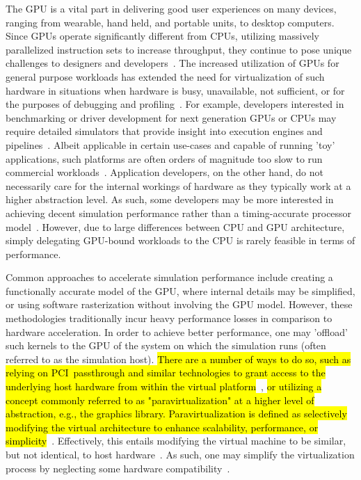 The GPU is a vital part in delivering good user experiences on many devices, ranging from wearable, hand held, and portable units, to desktop computers.
Since GPUs operate significantly different from CPUs, utilizing massively parallelized instruction sets to increase throughput, they continue to pose unique challenges to designers and developers~.
The increased utilization of GPUs for general purpose workloads has extended the need for virtualization of such hardware in situations when hardware is busy, unavailable, not sufficient, or for the purposes of debugging and profiling~.
For example, developers interested in benchmarking or driver development for next generation GPUs or CPUs may require detailed simulators that provide insight into execution engines and pipelines~.
Albeit applicable in certain use-cases and capable of running 'toy' applications, such platforms are often orders of magnitude too slow to run commercial workloads~.
Application developers, on the other hand, do not necessarily care for the internal workings of hardware as they typically work at a higher abstraction level.
As such, some developers may be more interested in achieving decent simulation performance rather than a timing-accurate processor model~.
However, due to large differences between CPU and GPU architecture, simply delegating GPU-bound workloads to the CPU is rarely feasible in terms of performance.

Common approaches to accelerate simulation performance include creating a functionally accurate model of the GPU, where internal details may be simplified, or using software rasterization without involving the GPU model.
However, these methodologies traditionally incur heavy performance losses in comparison to hardware acceleration.
In order to achieve better performance, one may 'offload' such kernels to the GPU of the system on which the simulation runs (often referred to as the simulation host).
\hl{There are a number of ways to do so, such as relying on PCI~passthrough and similar technologies to grant access to the underlying host hardware from within the virtual platform}~, \hl{or utilizing a concept commonly referred to as "paravirtualization" at a higher level of abstraction, e.g., the graphics library.
Paravirtualization is defined as selectively modifying the virtual architecture to enhance scalability, performance, or simplicity}~.
Effectively, this entails modifying the virtual machine to be similar, but not identical, to host hardware~.
As such, one may simplify the virtualization process by neglecting some hardware compatibility~.

